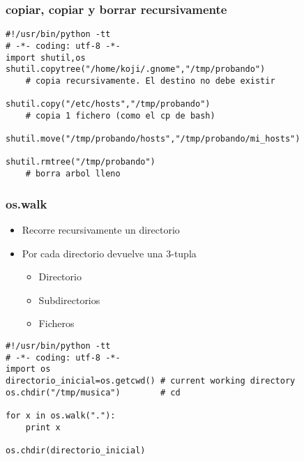 \documentclass[ucs]{beamer}
\begin{document}
\begin{frame}[fragile]
\frametitle{copiar, copiar y borrar recursivamente}
  \begin{scriptsize}
  \begin{verbatim}
#!/usr/bin/python -tt
# -*- coding: utf-8 -*-
import shutil,os
shutil.copytree("/home/koji/.gnome","/tmp/probando")  
    # copia recursivamente. El destino no debe existir

shutil.copy("/etc/hosts","/tmp/probando")             
    # copia 1 fichero (como el cp de bash)

shutil.move("/tmp/probando/hosts","/tmp/probando/mi_hosts")

shutil.rmtree("/tmp/probando")                        
    # borra arbol lleno
  \end{verbatim}
  \end{scriptsize}
\end{frame}




\begin{frame}[fragile]
\frametitle{os.walk}
\begin{itemize}
\item
Recorre recursivamente un directorio
\item
Por cada directorio devuelve una 3-tupla

\begin{itemize}
\item
Directorio
\item
Subdirectorios
\item
Ficheros
\end{itemize}
\end{itemize}
  
  \begin{scriptsize}
  \begin{verbatim}
#!/usr/bin/python -tt
# -*- coding: utf-8 -*-
import os
directorio_inicial=os.getcwd() # current working directory
os.chdir("/tmp/musica")        # cd

for x in os.walk("."):
    print x

os.chdir(directorio_inicial)
  \end{verbatim}
  \end{scriptsize}
\end{frame}
\end{document}
